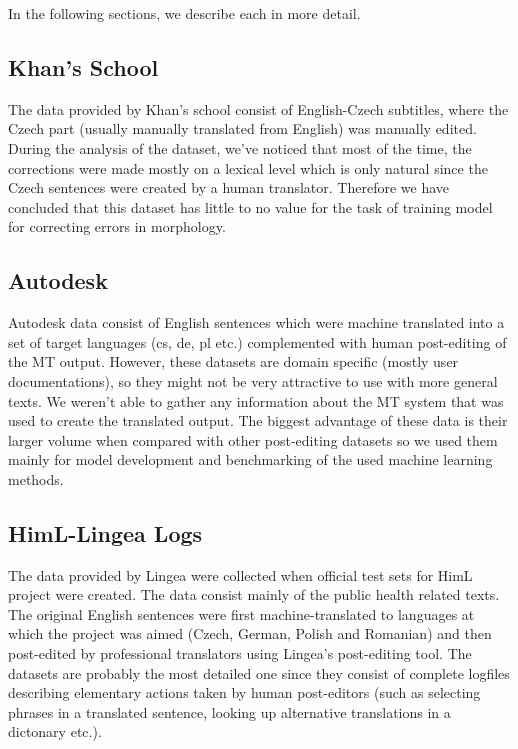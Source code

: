 In the following sections, we describe each in more detail.

\subsection{Khan's School}

The data provided by Khan's school consist of English-Czech subtitles,
where the Czech part (usually manually translated from English) was manually
edited. During the analysis of the dataset,
we've noticed that most of the time, the corrections were made
mostly on a lexical level which is only natural since the Czech sentences
were created by a human translator.
Therefore we have concluded that this dataset has little to no value
for the task of training model for correcting errors in morphology.


\subsection{Autodesk}

Autodesk data consist of English sentences which were machine translated into
a set of target languages (cs, de, pl etc.) complemented with human post-editing
of the MT output. However, these datasets are domain specific (mostly user documentations),
so they might not be very attractive to use with more general texts.
We weren't able to gather any information about the MT system that was used
to create the translated output. The biggest advantage of these data is
their larger volume when compared with other post-editing datasets so we
used them mainly for model development and benchmarking of the used machine
learning methods.

\subsection{HimL-Lingea Logs}

The data provided by Lingea were collected when official test sets for
HimL project were
created. The data consist mainly of the public health related texts.
The original English sentences were first
machine-translated to languages at which
the project was aimed (Czech, German, Polish and Romanian)
and then post-edited by professional
translators using Lingea's post-editing tool. The datasets are probably the most
detailed one since they consist of complete logfiles
describing elementary actions taken by human post-editors (such as selecting
phrases in a translated sentence, looking up alternative translations
in a dictonary etc.).

